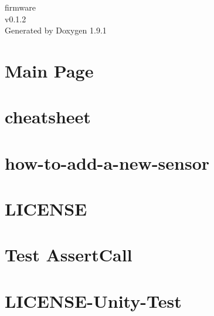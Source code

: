 \let\mypdfximage\pdfximage\def\pdfximage{\immediate\mypdfximage}\documentclass[twoside]{book}
\newcommand{\+}{\discretionary{\mbox{\scriptsize$\hookleftarrow$}}{}{}}
\newcommand{\clearemptydoublepage}{%
  \newpage{\pagestyle{empty}\cleardoublepage}%
}
\begin{document}
\raggedbottom

\hypersetup{pageanchor=false,
             bookmarksnumbered=true,
             pdfencoding=unicode
            }
\begin{titlepage}
\vspace*{7cm}
\begin{center}%
{\Large firmware \\[1ex]\large v0.\+1.\+2 }\\
\vspace*{1cm}
{\large Generated by Doxygen 1.9.1}\\
\end{center}
\end{titlepage}
\clearemptydoublepage
{}
\tableofcontents
\clearemptydoublepage
{}
\hypersetup{pageanchor=true}

\chapter{Main Page}
\label{index}\hypertarget{index}{}
\chapter{cheatsheet}
\label{md_cheatsheet}

\chapter{how-\/to-\/add-\/a-\/new-\/sensor}
\label{md_how_to_add_a_new_sensor}

\chapter{LICENSE}
\label{md_LICENSE}

\chapter{Test Assert\+Call}
\label{md_mock_c_build_test_runner}

\chapter{LICENSE-\/\+Unity-\/\+Test}
\label{md_mock_c_LICENSE_Unity_Test}

\end{document}
